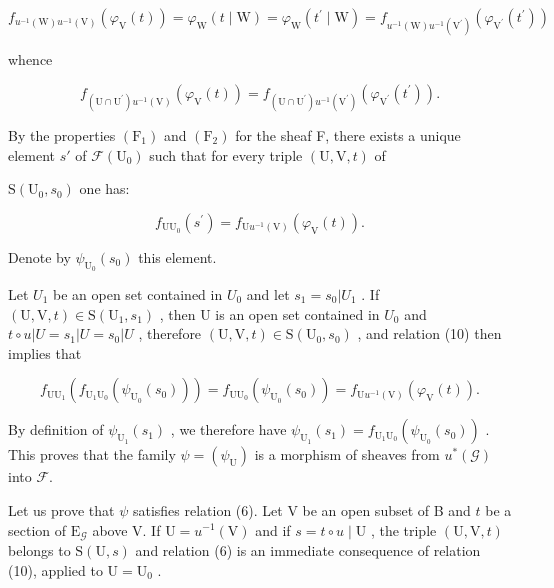 \[
f_{u^{-1}(\mathrm{W})u^{-1}(\mathrm{V})}(\varphi_{\mathrm{V}}(t)) = \varphi_{\mathrm{W}}(t\mid \mathrm{W}) = \varphi_{\mathrm{W}}(t^{\prime}\mid \mathrm{W}) = f_{u^{-1}(\mathrm{W})u^{-1}(\mathrm{V}^{\prime})}(\varphi_{\mathrm{V}^{\prime}}(t^{\prime}))
\]

whence

\[
f_{(\mathrm{U}\cap\mathrm{U}^{\prime})u^{-1}(\mathrm{V})}(\varphi_{\mathrm{V}}(t)) = f_{(\mathrm{U}\cap\mathrm{U}^{\prime})u^{-1}(\mathrm{V}^{\prime})}(\varphi_{\mathrm{V}^{\prime}}(t^{\prime})).\tag{9}
\]

By the properties \((\mathrm{F}_{1})\) and \((\mathrm{F}_{2})\) for the sheaf F, there exists a unique element \(s'\) of \(\mathcal{F}(\mathrm{U}_{0})\) such that for every triple \((\mathrm{U},\mathrm{V},t)\) of

\(\mathrm{S}(\mathrm{U}_{0},s_{0})\) one has:

\[
f_{\mathrm{U}\mathrm{U}_{0}}(s^{\prime}) = f_{\mathrm{U}u^{-1}(\mathrm{V})}(\varphi_{\mathrm{V}}(t)).\tag{10}
\]

Denote by \(\psi_{\mathrm{U}_{0}}(s_{0})\) this element.

Let \(U_{1}\) be an open set contained in \(U_{0}\) and let \(s_{1}=s_{0}|U_{1}\) . If \((\mathrm{U},\mathrm{V},t)\in\mathrm{S}(\mathrm{U}_{1},s_{1})\) , then U is an open set contained in \(U_{0}\) and \(t\circ u|U=s_{1}|U=s_{0}|U\) , therefore \((\mathrm{U},\mathrm{V},t)\in\mathrm{S}(\mathrm{U}_{0},s_{0})\) , and relation (10) then implies that

\[
f_{\mathrm{U}\mathrm{U}_{1}}(f_{\mathrm{U}_{1}\mathrm{U}_{0}}(\psi_{\mathrm{U}_{0}}(s_{0}))) = f_{\mathrm{U}\mathrm{U}_{0}}(\psi_{\mathrm{U}_{0}}(s_{0})) = f_{\mathrm{U}u^{-1}(\mathrm{V})}(\varphi_{\mathrm{V}}(t)).
\]

By definition of \(\psi_{\mathrm{U}_{1}}(s_{1})\) , we therefore have \(\psi_{\mathrm{U}_{1}}(s_{1}) = f_{\mathrm{U}_{1}\mathrm{U}_{0}}(\psi_{\mathrm{U}_{0}}(s_{0}))\) . This proves that the family \(\psi = (\psi_{\mathrm{U}})\) is a morphism of sheaves from \(u^{*}(\mathcal{G})\) into \(\mathcal{F}\).

Let us prove that \(\psi\) satisfies relation (6). Let V be an open subset of B and \(t\) be a section of \(\mathrm{E}_{\mathcal{G}}\) above V. If \(\mathrm{U} = u^{-1}(\mathrm{V})\) and if \(s = t \circ u \mid \mathrm{U}\) , the triple \((\mathrm{U}, \mathrm{V}, t)\) belongs to \(\mathrm{S}(\mathrm{U}, s)\) and relation (6) is an immediate consequence of relation (10), applied to \(\mathrm{U} = \mathrm{U}_0\) .

